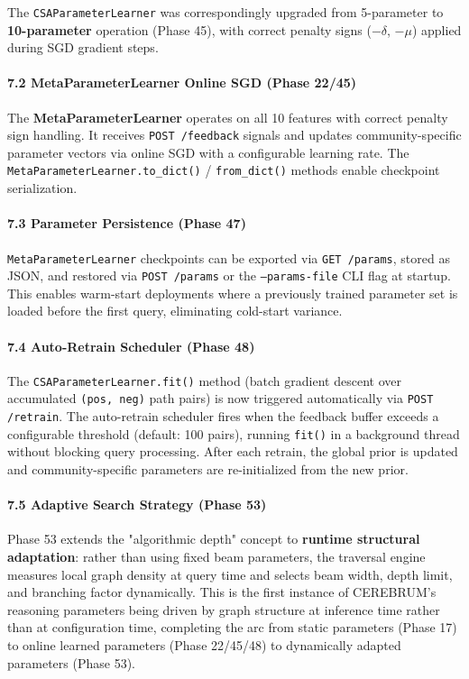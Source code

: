The \texttt{CSAParameterLearner} was corre\-spondingly upgraded from 5-parameter to \textbf{10-parameter} operation (Phase 45), with correct penalty signs ($-\delta$, $-\mu$) applied during SGD gradient steps.

\paragraph{7.2 MetaParameterLearner Online SGD (Phase 22/45)}
The \textbf{MetaParameterLearner} operates on all 10 features with correct penalty sign handling. It receives \texttt{POST /feedback} signals and updates community-specific parameter vectors via online SGD with a confi\-gurable learning rate. The \texttt{MetaParameterLearner.to\_dict()} / \texttt{from\_dict()} methods enable checkpoint seria\-lization.

\paragraph{7.3 Parameter Persistence (Phase 47)}
\texttt{MetaParameterLearner} checkpoints can be exported via \texttt{GET /params}, stored as JSON, and restored via \texttt{POST /params} or the \texttt{--params-file} CLI flag at startup. This enables warm-start deployments where a previously trained parameter set is loaded before the first query, eliminating cold-start variance.

\paragraph{7.4 Auto-Retrain Scheduler (Phase 48)}
The \texttt{CSAParameterLearner.fit()} method (batch gradient descent over accumulated \texttt{(pos, neg)} path pairs) is now triggered autom\-atically via \texttt{POST /retrain}. The auto-retrain scheduler fires when the feedback buffer exceeds a confi\-gurable threshold (default: 100 pairs), running \texttt{fit()} in a background thread without blocking query processing. After each retrain, the global prior is updated and community-specific parameters are re-initialized from the new prior.

\paragraph{7.5 Adaptive Search Strategy (Phase 53)}
Phase 53 extends the "algorithmic depth" concept to \textbf{runtime structural adaptation}: rather than using fixed beam parameters, the traversal engine measures local graph density at query time and selects beam width, depth limit, and branching factor dynamically. This is the first instance of CEREBRUM's reasoning parameters being driven by graph structure at inference time rather than at confi\-guration time, completing the arc from static parameters (Phase 17) to online learned parameters (Phase 22/45/48) to dynamically adapted parameters (Phase 53).

